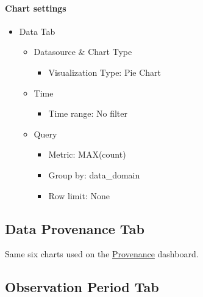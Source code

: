 \documentclass[
]{book}
\providecommand{\tightlist}{%
  \setlength{\itemsep}{0pt}\setlength{\parskip}{0pt}}
\begin{document}
\hypertarget{chart-settings-4}{%
\paragraph*{Chart settings}\label{chart-settings-4}}

\begin{itemize}
\tightlist
\item
  Data Tab

  \begin{itemize}
  \tightlist
  \item
    Datasource \& Chart Type

    \begin{itemize}
    \tightlist
    \item
      Visualization Type: Pie Chart
    \end{itemize}
  \item
    Time

    \begin{itemize}
    \tightlist
    \item
      Time range: No filter
    \end{itemize}
  \item
    Query

    \begin{itemize}
    \tightlist
    \item
      Metric: MAX(count)
    \item
      Group by: data\_domain
    \item
      Row limit: None
    \end{itemize}
  \end{itemize}
\end{itemize}

\hypertarget{data-provenance-tab}{%
\subsection*{Data Provenance Tab}\label{data-provenance-tab}}

Same six charts used on the \protect\hyperlink{dataProvenanceCharts}{Provenance} dashboard.

\hypertarget{observation-period-tab}{%
\subsection*{Observation Period Tab}\label{observation-period-tab}}
\end{document}
